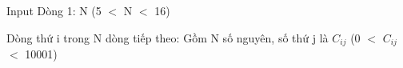 Input
Dòng 1: N (5 $<$ N $<$ 16)  

   Dòng thứ i trong N dòng tiếp theo: Gồm N số nguyên, số thứ j là $C_{ij}$   (0 $<$ $C_{ij}$   $<$ 10001)